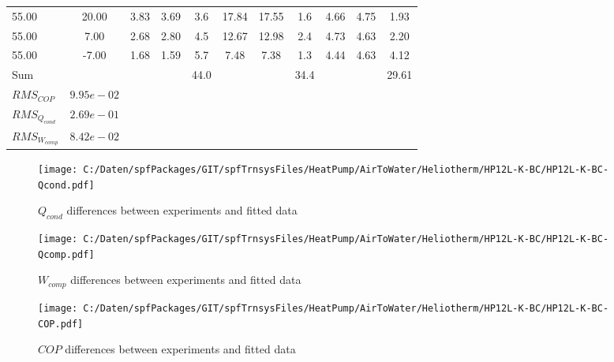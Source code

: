 \documentclass[english]{SPFShortReport}
\begin{document}
\begin{table}[!ht]
\begin{small}
\begin{center}
{\begin{tabular}{l | c c c c c c c c c c }
55.00  & 20.00 & 3.83 & 3.69 & 3.6 & 17.84 & 17.55 & 1.6 & 4.66 & 4.75 & 1.93\\ 
55.00  & 7.00 & 2.68 & 2.80 & 4.5 & 12.67 & 12.98 & 2.4 & 4.73 & 4.63 & 2.20\\ 
55.00  & -7.00 & 1.68 & 1.59 & 5.7 & 7.48 & 7.38 & 1.3 & 4.44 & 4.63 & 4.12\\ 
\hline 
 Sum &  & &  & 44.0 &  &  & 34.4 & &  & 29.61\\ 
\hline 
 $RMS_{COP}$ & $9.95e-02$ \\ 
 $RMS_{Q_{cond}}$ & $2.69e-01$ \\ 
 $RMS_{W_{comp}}$ & $8.42e-02$ \\ 
\hline
\hline
\end{tabular}
}
\label{ErrorsTable}
\end{center}
\end{small}
\end{table}
\begin{figure}[!ht]
\begin{center}
\texttt{[image: C:/Daten/spfPackages/GIT/spfTrnsysFiles/HeatPump/AirToWater/Heliotherm/HP12L-K-BC/HP12L-K-BC-Qcond.pdf]}
\caption{$Q_{cond}$ differences between experiments and fitted data}
\label{QcongFig}
\end{center}
\end{figure}
\begin{figure}[!ht]
\begin{center}
\texttt{[image: C:/Daten/spfPackages/GIT/spfTrnsysFiles/HeatPump/AirToWater/Heliotherm/HP12L-K-BC/HP12L-K-BC-Qcomp.pdf]}
\caption{$W_{comp}$ differences between experiments and fitted data}
\label{QcompFig}
\end{center}
\end{figure}
\begin{figure}[!ht]
\begin{center}
\texttt{[image: C:/Daten/spfPackages/GIT/spfTrnsysFiles/HeatPump/AirToWater/Heliotherm/HP12L-K-BC/HP12L-K-BC-COP.pdf]}
\caption{$COP$ differences between experiments and fitted data}
\label{COPFig}
\end{center}
\end{figure}
\end{document}
